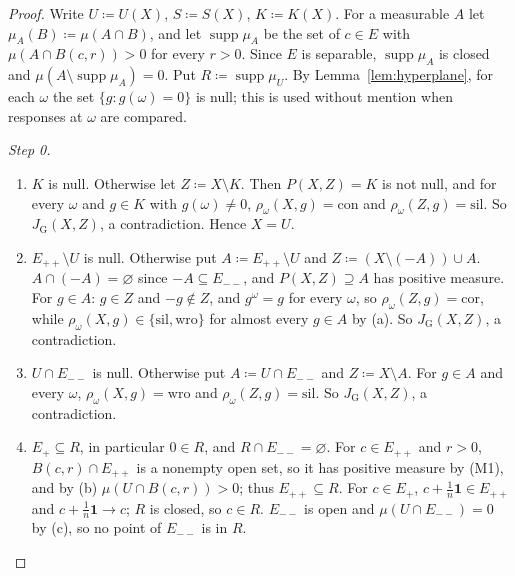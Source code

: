 \documentclass[11pt]{article}
\theoremstyle{definition}
\newcommand{\one}{\mathbf 1}
\newcommand{\supp}{\operatorname{supp}}
\newcommand{\cor}{\mathrm{cor}}
\newcommand{\sil}{\mathrm{sil}}
\newcommand{\wro}{\mathrm{wro}}
\newcommand{\con}{\mathrm{con}}
\newcommand{\GU}{\mathrm{G}}
\begin{document}
\begin{proof}
Write $U\coloneqq U(X)$, $S\coloneqq S(X)$, $K\coloneqq K(X)$. For a measurable $A$ let $\mu_A(B)\coloneqq\mu(A\cap B)$, and let $\supp\mu_A$ be the set of $c\in E$ with $\mu(A\cap B(c,r))>0$ for every $r>0$. Since $E$ is separable, $\supp\mu_A$ is closed and $\mu(A\setminus\supp\mu_A)=0$. Put $R\coloneqq\supp\mu_U$. By Lemma~\ref{lem:hyperplane}, for each $\omega$ the set $\{g:g(\omega)=0\}$ is null; this is used without mention when responses at $\omega$ are compared.

\emph{Step 0.}
\begin{enumerate}[label=(\alph*)]
\item $K$ is null. Otherwise let $Z\coloneqq X\setminus K$. Then $P(X,Z)=K$ is not null, and for every $\omega$ and $g\in K$ with $g(\omega)\ne0$, $\rho_\omega(X,g)=\con$ and $\rho_\omega(Z,g)=\sil$. So $J_\GU(X,Z)$, a contradiction. Hence $X=U$.
\item $E_{++}\setminus U$ is null. Otherwise put $A\coloneqq E_{++}\setminus U$ and $Z\coloneqq(X\setminus(-A))\cup A$. $A\cap(-A)=\varnothing$ since $-A\subseteq E_{--}$, and $P(X,Z)\supseteq A$ has positive measure. For $g\in A$: $g\in Z$ and $-g\notin Z$, and $g^\omega=g$ for every $\omega$, so $\rho_\omega(Z,g)=\cor$, while $\rho_\omega(X,g)\in\{\sil,\wro\}$ for almost every $g\in A$ by (a). So $J_\GU(X,Z)$, a contradiction.
\item $U\cap E_{--}$ is null. Otherwise put $A\coloneqq U\cap E_{--}$ and $Z\coloneqq X\setminus A$. For $g\in A$ and every $\omega$, $\rho_\omega(X,g)=\wro$ and $\rho_\omega(Z,g)=\sil$. So $J_\GU(X,Z)$, a contradiction.
\item $E_+\subseteq R$, in particular $0\in R$, and $R\cap E_{--}=\varnothing$. For $c\in E_{++}$ and $r>0$, $B(c,r)\cap E_{++}$ is a nonempty open set, so it has positive measure by (M1), and by (b) $\mu(U\cap B(c,r))>0$; thus $E_{++}\subseteq R$. For $c\in E_+$, $c+\tfrac1n\one\in E_{++}$ and $c+\tfrac1n\one\to c$; $R$ is closed, so $c\in R$. $E_{--}$ is open and $\mu(U\cap E_{--})=0$ by (c), so no point of $E_{--}$ is in $R$.
\end{enumerate}


\end{proof}
\end{document}

